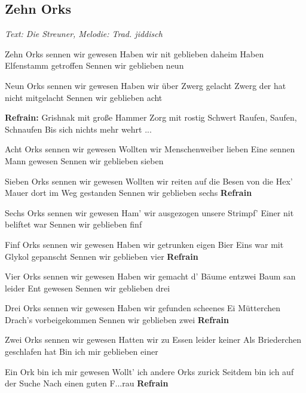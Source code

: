 \documentclass[a5paper,pagesize,twoside,10pt,headings=small]{scrreprt}
\newcommand\songheader[3][]{%
  \clearpage%
    \subsection*{\centering #2}\vspace{0.5\baselineskip}%
    \addcontentsline{toc}{subsection}{#2}
    \centering \textit{#3}\\%
    \vspace{\baselineskip}\par%
}
\newcommand\Refrain{\textbf{Refrain}\vspace{-1.0\baselineskip}}
\newcommand\Refraindef{\textbf{Refrain:}}
\begin{document}
\songheader{Zehn Orks}{Text: Die Streuner, Melodie: Trad. jiddisch}
\begin{multicols*}{2}
\begin{guitar}
Zehn Orks sennen wir gewesen
Haben wir nit geblieben daheim
Haben Elfenstamm getroffen
Sennen wir geblieben neun

Neun Orks sennen wir gewesen
Haben wir über Zwerg gelacht
Zwerg der hat nicht mitgelacht
Sennen wir geblieben acht

\Refraindef
Grishnak mit große Hammer
Zorg mit rostig Schwert
Raufen, Saufen, Schnaufen
Bis sich nichts mehr wehrt ...

Acht Orks sennen wir gewesen
Wollten wir Menschenweiber lieben
Eine sennen Mann gewesen
Sennen wir geblieben sieben

Sieben Orks sennen wir gewesen
Wollten wir reiten auf die Besen von die Hex'
Mauer dort im Weg gestanden
Sennen wir geblieben sechs
\Refrain

\columnbreak

Sechs Orks sennen wir gewesen
Ham' wir ausgezogen unsere Strimpf'
Einer nit beliftet war
Sennen wir geblieben finf

Finf Orks sennen wir gewesen
Haben wir getrunken eigen Bier
Eins war mit Glykol gepanscht
Sennen wir geblieben vier
\Refrain

Vier Orks sennen wir gewesen
Haben wir gemacht d' Bäume entzwei
Baum san leider Ent gewesen
Sennen wir geblieben drei

Drei Orks sennen wir gewesen
Haben wir gefunden scheenes Ei
Mütterchen Drach's vorbeigekommen
Sennen wir geblieben zwei
\Refrain

Zwei Orks sennen wir gewesen
Hatten wir zu Essen leider keiner
Als Briederchen geschlafen hat
Bin ich mir geblieben einer

Ein Ork bin ich mir gewesen
Wollt' ich andere Orks zurick
Seitdem bin ich auf der Suche
Nach einen guten F...rau
\Refrain
\end{guitar}
\end{multicols*}
\end{document}
